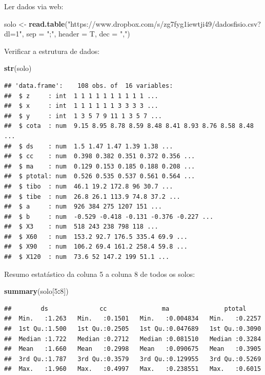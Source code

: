 \documentclass[
]{book}
\newenvironment{Shaded}{\begin{snugshade}}{\end{snugshade}}
\newcommand{\DataTypeTok}[1]{\textcolor[rgb]{0.13,0.29,0.53}{#1}}
\newcommand{\DecValTok}[1]{\textcolor[rgb]{0.00,0.00,0.81}{#1}}
\newcommand{\KeywordTok}[1]{\textcolor[rgb]{0.13,0.29,0.53}{\textbf{#1}}}
\newcommand{\NormalTok}[1]{#1}
\newcommand{\OperatorTok}[1]{\textcolor[rgb]{0.81,0.36,0.00}{\textbf{#1}}}
\newcommand{\StringTok}[1]{\textcolor[rgb]{0.31,0.60,0.02}{#1}}
\begin{document}
Ler dados via web:

\begin{Shaded}
\begin{Highlighting}[]
\NormalTok{solo <-}\StringTok{ }\KeywordTok{read.table}\NormalTok{(}\StringTok{"https://www.dropbox.com/s/zg7fyg1iewtji49/dadosfisio.csv?dl=1"}\NormalTok{, }\DataTypeTok{sep =} \StringTok{";"}\NormalTok{, }\DataTypeTok{header =}\NormalTok{ T, }\DataTypeTok{dec =} \StringTok{","}\NormalTok{)}
\end{Highlighting}
\end{Shaded}

Verificar a estrutura de dados:

\begin{Shaded}
\begin{Highlighting}[]
\KeywordTok{str}\NormalTok{(solo)}
\end{Highlighting}
\end{Shaded}

\begin{verbatim}
## 'data.frame':    108 obs. of  16 variables:
##  $ z     : int  1 1 1 1 1 1 1 1 1 1 ...
##  $ x     : int  1 1 1 1 1 1 3 3 3 3 ...
##  $ y     : int  1 3 5 7 9 11 1 3 5 7 ...
##  $ cota  : num  9.15 8.95 8.78 8.59 8.48 8.41 8.93 8.76 8.58 8.48 ...
##  $ ds    : num  1.5 1.47 1.47 1.39 1.38 ...
##  $ cc    : num  0.398 0.382 0.351 0.372 0.356 ...
##  $ ma    : num  0.129 0.153 0.185 0.188 0.208 ...
##  $ ptotal: num  0.526 0.535 0.537 0.561 0.564 ...
##  $ tibo  : num  46.1 19.2 172.8 96 30.7 ...
##  $ tibe  : num  26.8 26.1 113.9 74.8 37.2 ...
##  $ a     : num  926 384 275 1207 151 ...
##  $ b     : num  -0.529 -0.418 -0.131 -0.376 -0.227 ...
##  $ X3    : num  518 243 238 798 118 ...
##  $ X60   : num  153.2 92.7 176.5 335.4 69.9 ...
##  $ X90   : num  106.2 69.4 161.2 258.4 59.8 ...
##  $ X120  : num  73.6 52 147.2 199 51.1 ...
\end{verbatim}

Resumo estatástico da coluna 5 a coluna 8 de todos os solos:

\begin{Shaded}
\begin{Highlighting}[]
\KeywordTok{summary}\NormalTok{(solo[}\DecValTok{5}\OperatorTok{:}\DecValTok{8}\NormalTok{])}
\end{Highlighting}
\end{Shaded}

\begin{verbatim}
##        ds              cc               ma               ptotal      
##  Min.   :1.263   Min.   :0.1501   Min.   :0.004834   Min.   :0.2257  
##  1st Qu.:1.500   1st Qu.:0.2505   1st Qu.:0.047689   1st Qu.:0.3090  
##  Median :1.722   Median :0.2712   Median :0.081510   Median :0.3284  
##  Mean   :1.660   Mean   :0.2998   Mean   :0.090675   Mean   :0.3905  
##  3rd Qu.:1.787   3rd Qu.:0.3579   3rd Qu.:0.129955   3rd Qu.:0.5269  
##  Max.   :1.960   Max.   :0.4997   Max.   :0.238551   Max.   :0.6015
\end{verbatim}
\end{document}
